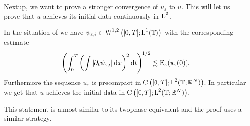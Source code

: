 Nextup, we want to prove a stronger convergence of $ u_{ \varepsilon } $ to $ u 
$. This will let us prove that $ u $ achieves its initial data continuously in 
$ \operatorname{L}^{ 2 } $.

\begin{lemma}
	\label{continuity_in_l2_and_initial_data_multiphase}
	In the situation of  we have 
	$ \psi_{ \varepsilon , i } \in \operatorname{W}^{ 1 , 2 } \left(
		[ 0 , T ] ; \operatorname{L}^{ 1 } ( \operatorname{\mathbb{T}} )
	\right)
	$
	with the corresponding estimate
	\begin{equation}
		\label{l2_estimate_on_partial_t_psi_i}
		\left(
			\int_{ 0 }^{ T }
				\left(
					\int
						\abs{ \partial_{ t } \psi_{ \varepsilon , i } }
					\dd{ x }
				\right)^{ 2 }
			\dd{ t }
		\right)^{ 1/2 }
		\lesssim
		\operatorname{E}_{ \varepsilon } ( u_{ \varepsilon }( 0 ) ).
	\end{equation}
	Furthermore the sequence $ u_{ \varepsilon } $ is precompact in 
	$ \operatorname{C} \left(
		[ 0 , T ] ; \operatorname{L}^{ 2 } ( \operatorname{\mathbb{T}} ; \mathbb{ R }^{ N } )
	\right) $.
	In particular we get that $ u $ achieves the initial data in 
	$ \operatorname{C} \left( [ 0 , T ] ; \operatorname{L}^{ 2 } ( \operatorname{\mathbb{T}} ; \mathbb{ R }^{ N } )
	\right) $.
\end{lemma}

\begin{remark}
	This statement is almost similar to its twophase equivalent  and the proof uses a similar strategy.
\end{remark}

